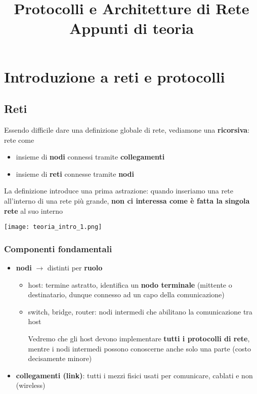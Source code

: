 

\title{%
Protocolli e Architetture di Rete\\
\large Appunti di teoria}


\maketitle
\tableofcontents
\newpage
\section{Introduzione a reti e protocolli}

\subsection{Reti}

\begin{minipage}[c]{.6\textwidth}
Essendo difficile dare una definizione globale di rete, vediamone una \textbf{ricorsiva}: rete come
\begin{itemize}
  \item insieme di \textbf{nodi} connessi tramite \textbf{collegamenti}
  \item insieme di \textbf{reti} connesse tramite \textbf{nodi}
\end{itemize}
La definizione introduce una prima astrazione: quando inseriamo una rete all'interno di una rete pi\`u grande, \textbf{non ci interessa come \`e fatta la singola rete} al suo interno
\end{minipage}
\begin{minipage}[c]{.4\textwidth}
\texttt{[image: teoria\_intro\_1.png]}
\end{minipage}

\subsubsection{Componenti fondamentali}

\begin{itemize}
  \item \textbf{nodi} $\rightarrow$ distinti per \textbf{ruolo}
    \begin{itemize}
      \item host: termine astratto, identifica un \textbf{nodo terminale} (mittente o destinatario, dunque connesso ad un capo della comunicazione)
      \item switch, bridge, router: nodi intermedi che abilitano la comunicazione tra host
      \begin{emphasize}
          Vedremo che gli host devono implementare \textbf{tutti i protocolli di rete}, mentre i nodi intermedi possono conoscerne anche solo una parte (costo decisamente minore)
      \end{emphasize}
      
    \end{itemize}
  \item \textbf{collegamenti (link)}: tutti i mezzi fisici usati per comunicare, cablati e non (wireless)
\end{itemize}

